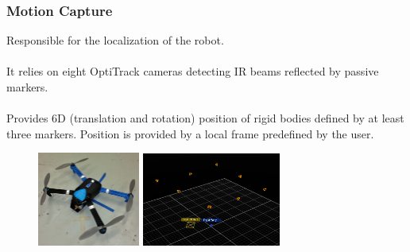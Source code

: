 \documentclass[xcolor=dvipsnames]{beamer}
\begin{document}
\begin{frame}
\frametitle{Motion Capture}
Responsible for the localization of the robot.\\~\\

It relies on eight OptiTrack cameras detecting IR beams reflected by passive markers. \\~\\

Provides 6D (translation and rotation) position of rigid bodies defined by at least three markers. Position is provided by a local frame predefined by the user. 
\begin{figure}
\centering
\includegraphics[width = 0.3\textwidth]{f/irismarker.jpg} \hspace{2em}
\includegraphics[width = 0.405\textwidth]{f/motiv_panorama.PNG}
\end{figure}
\end{frame}
\end{document}
